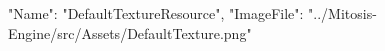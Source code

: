 {
  "Name": "DefaultTextureResource",
  "ImageFile": "../Mitosis-Engine/src/Assets/DefaultTexture.png"
}